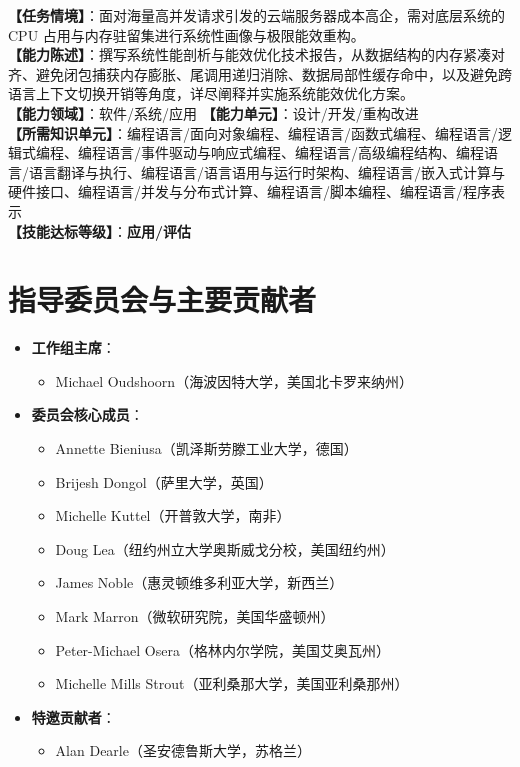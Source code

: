 \begin{taskbox}[任务 11：撰写系统级资源优化白皮书解析程序在内存与算力占用上的高效执行机制]
\textbf{【任务情境】}：面对海量高并发请求引发的云端服务器成本高企，需对底层系统的 CPU 占用与内存驻留集进行系统性画像与极限能效重构。\\
\textbf{【能力陈述】}：撰写系统性能剖析与能效优化技术报告，从数据结构的内存紧凑对齐、避免闭包捕获内存膨胀、尾调用递归消除、数据局部性缓存命中，以及避免跨语言上下文切换开销等角度，详尽阐释并实施系统能效优化方案。\\
\textbf{【能力领域】}：软件/系统/应用 \quad \textbf{【能力单元】}：设计/开发/重构改进\\
\textbf{【所需知识单元】}：编程语言/面向对象编程、编程语言/函数式编程、编程语言/逻辑式编程、编程语言/事件驱动与响应式编程、编程语言/高级编程结构、编程语言/语言翻译与执行、编程语言/语言语用与运行时架构、编程语言/嵌入式计算与硬件接口、编程语言/并发与分布式计算、编程语言/脚本编程、编程语言/程序表示\\
\textbf{【技能达标等级】}：\textbf{应用/评估}
\end{taskbox}

\section{指导委员会与主要贡献者}

\begin{itemize}
    \item \textbf{工作组主席}：
    \begin{itemize}
        \item Michael Oudshoorn（海波因特大学，美国北卡罗来纳州）
    \end{itemize}
    \item \textbf{委员会核心成员}：
    \begin{itemize}
        \item Annette Bieniusa（凯泽斯劳滕工业大学，德国）
        \item Brijesh Dongol（萨里大学，英国）
        \item Michelle Kuttel（开普敦大学，南非）
        \item Doug Lea（纽约州立大学奥斯威戈分校，美国纽约州）
        \item James Noble（惠灵顿维多利亚大学，新西兰）
        \item Mark Marron（微软研究院，美国华盛顿州）
        \item Peter-Michael Osera（格林内尔学院，美国艾奥瓦州）
        \item Michelle Mills Strout（亚利桑那大学，美国亚利桑那州）
    \end{itemize}
    \item \textbf{特邀贡献者}：
    \begin{itemize}
        \item Alan Dearle（圣安德鲁斯大学，苏格兰）
    \end{itemize}
\end{itemize}

